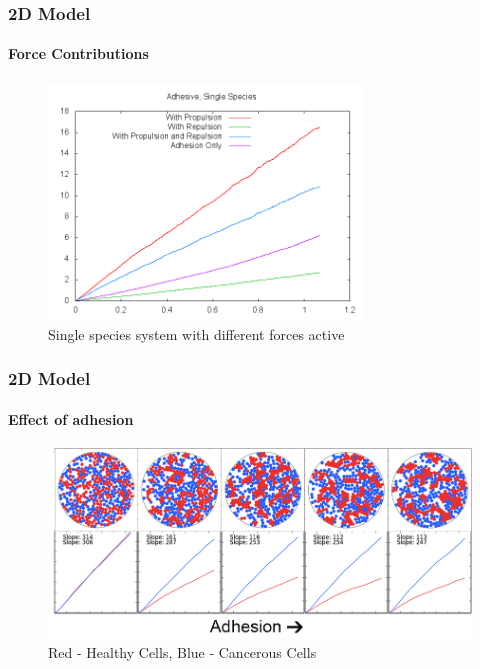 \documentclass{beamer}
\begin{document}
  \begin{frame}
    \frametitle{2D Model}
    \framesubtitle{Force Contributions}
    \begin{figure}
      \includegraphics[width=3.3in]{msd2D.png}
      \caption{Single species system with different forces active}
    \end{figure}
    \vfill
  \end{frame}

  \begin{frame}
    \frametitle{2D Model}
    \framesubtitle{Effect of adhesion}
    \begin{figure}
      \includegraphics[width=4.5in]{adhinc.jpg}
      \caption{Red - Healthy Cells, Blue - Cancerous Cells}
    \end{figure}
    \vfill
  \end{frame}
\end{document}
